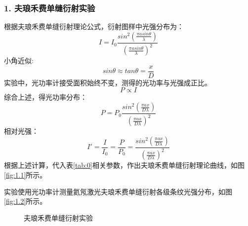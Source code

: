 \documentclass[12pt,a4paper,UTF8]{ctexart}
\begin{document}
\subsubsection*{1. 夫琅禾费单缝衍射实验}
根据夫琅禾费单缝衍射理论公式，衍射图样中光强分布为：
\begin{equation}\label{eq:1.1}
	I = I_0\frac{sin^2(\frac{\pi asin\theta}{\lambda})}{(\frac{\pi asin\theta}{\lambda})^2}
\end{equation}
小角近似:
\begin{equation}\label{eq:1.2}
	sin\theta \approx tan\theta = \frac{x}{D}
\end{equation}
实验中，光功率计接受面积始终不变，测得的光功率与光强成正比。
\begin{equation}\label{eq:1.3}
	P \propto I
\end{equation}
综合上述，得光功率分布：
\begin{equation}\label{eq:1.4}
	P = P_0\frac{sin^2(\frac{\pi ax}{D \lambda})}{(\frac{\pi ax}{D \lambda})^2}
\end{equation}
相对光强：
\begin{equation}\label{eq:1.5}
	I' = \frac{I}{I_0} = \frac{P}{P_0} = \frac{sin^2(\frac{\pi ax}{D \lambda})}{(\frac{\pi ax}{D \lambda})^2}
\end{equation}
根据上述计算，代入表\ref{tab:0}相关参数，作出夫琅禾费单缝衍射理论曲线，如图\ref{fig:1.1}所示。

实验使用光功率计测量氦氖激光夫琅禾费单缝衍射各级条纹光强分布，如图\ref{fig:1.2}所示。

\begin{figure}[htbp]
	\centering
	
	\caption{夫琅禾费单缝衍射实验}
\end{figure}
	
\end{document}
